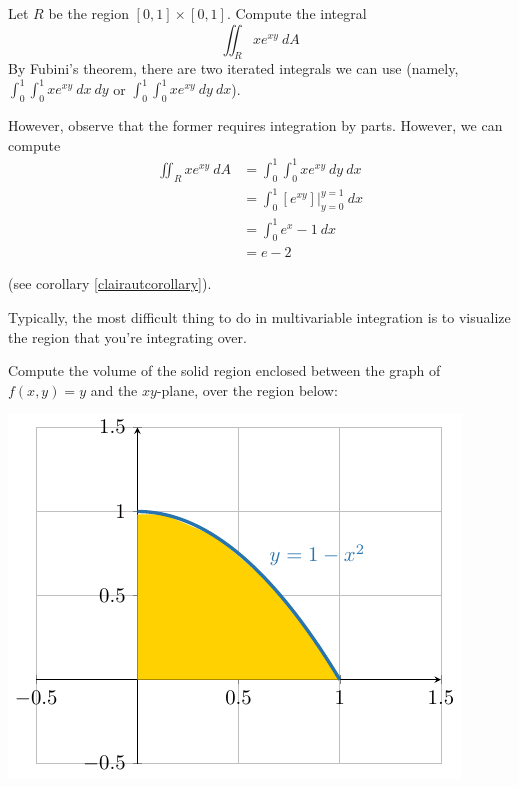     \begin{example}
        Let $R$ be the region $[0,1] \times [0,1]$.  Compute the integral 
        $$\iint_R xe^{xy} \ dA $$
        By Fubini's theorem, there are two iterated integrals we can use (namely, $\int_0^1\int_0^1 xe^{xy} \ dx \ dy$ or $\int_0^1\int_0^1 xe^{xy} \ dy \ dx$).  

        However, observe that the former requires integration by parts.  However, we can compute 
        \begin{align*}
            \iint_R xe^{xy} \ dA  &= \int_0^1\int_0^1 xe^{xy} \ dy \ dx \\
            &= \int_0^1 [e^{xy}] \bigg|_{y=0}^{y=1} \ dx \\
            &= \int_0^1 e^{x}-1 \ dx \\
            &= e-2
        \end{align*}
        
    \end{example}


    \begin{remark}
         (see corollary \ref{clairautcorollary}).
    \end{remark}

    Typically, the most difficult thing to do in multivariable integration is to visualize the region that you're integrating over.  

    \begin{example}
        Compute the volume of the solid region enclosed between the graph of  $f(x,y) = y$ and the $xy$-plane, over the region below:

        \begin{example}
    \begin{center}
            \includegraphics[scale=.7]{chapters/4-IntegrationRn/figures/figures-1-xsquaredregion.pdf}
    \end{center}
        \end{example}
        
    \end{example}

